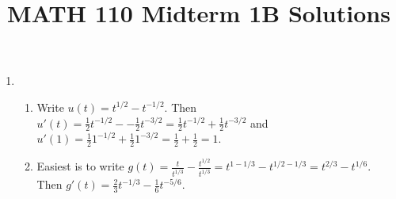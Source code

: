 \documentclass{article}
\title{MATH 110 Midterm 1B Solutions}
\author{\commonAuthor}
\date{\commonDateMTOne}
\newcommand{\ds}{\displaystyle}
\begin{document}
\maketitle
\begin{enumerate}
\item %
  \begin{enumerate}
  \item %
    Write $\ds u(t)=t^{1/2} - t^{-1/2}$.  Then $\ds u'(t)=\frac{1}{2} t^{-1/2}
    - -\frac{1}{2} t^{-3/2} = \frac{1}{2} t^{-1/2} + \frac{1}{2} t^{-3/2}$
    and $\ds u'(1)=\frac{1}{2} 1^{-1/2} + \frac{1}{2} 1^{-3/2} = 
    \frac{1}{2} + \frac{1}{2} = 1$.
  \item %
    Easiest is to write $\ds g(t) = \frac{t}{t^{1/3}} - \frac{t^{1/2}}{t^{1/3}}
    = t^{1-1/3} - t^{1/2-1/3} = t^{2/3} - t^{1/6}$.  Then
    $\ds g'(t) = \frac{2}{3} t^{-1/3} - \frac{1}{6} t^{-5/6}$.


\end{enumerate}
\end{enumerate}
\end{document}

